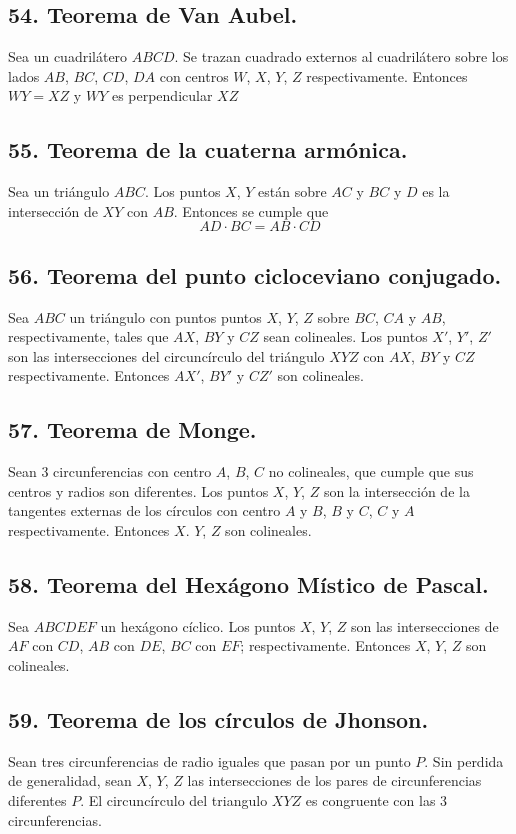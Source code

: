 \documentclass[12pt,a4paper]{article}
\begin{document}
\subsection*{54. Teorema de Van Aubel.}
Sea un cuadrilátero $ABCD$. Se trazan cuadrado externos al cuadrilátero sobre los lados $AB$, $BC$, $CD$, $DA$ con centros $W$, $X$, $Y$, $Z$ respectivamente. Entonces $WY= XZ$ y $WY$ es perpendicular $XZ$
\subsection*{55. Teorema de la cuaterna armónica.}
Sea un triángulo $ABC$. Los puntos $X$, $Y$ están sobre ${AC}$ y ${BC}$ y $D$ es la intersección de $XY$ con $AB$. Entonces se cumple que $$AD \cdot BC= AB \cdot CD$$

\subsection*{56. Teorema del punto cicloceviano conjugado.}
Sea $ABC$ un triángulo con puntos puntos $X$, $Y$, $Z$ sobre ${BC}$, ${CA}$ y ${AB}$, respectivamente, tales que $AX$, $BY$ y $CZ$ sean colineales. Los puntos $X'$, $Y'$, $Z'$ son las intersecciones del circuncírculo del triángulo $XYZ$ con $AX$, $BY$ y $CZ$ respectivamente. Entonces $AX'$, $BY'$ y $CZ'$ son colineales.
\subsection*{57. Teorema de Monge.}
Sean 3 circunferencias con centro $A$, $B$, $C$ no colineales, que cumple que sus centros y radios son diferentes. Los puntos $X$, $Y$, $Z$ son la intersección de la tangentes externas de los círculos con centro $A$ y $B$, $B$ y $C$, $C$ y $A$ respectivamente. Entonces $X$. $Y$, $Z$ son colineales. 
\subsection*{58. Teorema del Hexágono Místico de Pascal.}
Sea $ABCDEF$ un hexágono cíclico. Los puntos $X$, $Y$, $Z$ son las intersecciones de $AF$ con $CD$, $AB$ con $DE$, $BC$ con $EF$; respectivamente. Entonces $X$, $Y$, $Z$ son colineales.
\subsection*{59. Teorema de los círculos de Jhonson.}
Sean tres circunferencias de radio iguales que pasan por un punto $P$. Sin perdida de generalidad, sean $X$, $Y$, $Z$ las intersecciones de los pares de circunferencias diferentes $P$. El circuncírculo del triangulo $XYZ$ es congruente con las 3 circunferencias.
\end{document}
